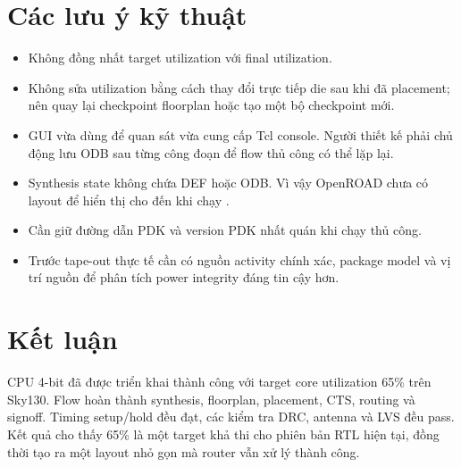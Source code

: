\documentclass[12pt,a4paper]{article}
\newcommand{\code}[1]{\texttt{\detokenize{#1}}}
\begin{document}
\section{Các lưu ý kỹ thuật}

\begin{itemize}
  \item Không đồng nhất target utilization với final utilization.
  \item Không sửa utilization bằng cách thay đổi trực tiếp die sau khi đã
  placement; nên quay lại checkpoint floorplan hoặc tạo một bộ checkpoint
  mới.
  \item GUI vừa dùng để quan sát vừa cung cấp Tcl console. Người thiết kế
  phải chủ động lưu ODB sau từng công đoạn để flow thủ công có thể lặp lại.
  \item Synthesis state không chứa DEF hoặc ODB. Vì vậy OpenROAD chưa có
  layout để hiển thị cho đến khi chạy \code{initialize_floorplan}.
  \item Cần giữ đường dẫn PDK và version PDK nhất quán khi chạy thủ công.
  \item Trước tape-out thực tế cần có nguồn activity chính xác, package
  model và vị trí nguồn để phân tích power integrity đáng tin cậy hơn.
\end{itemize}

\section{Kết luận}

CPU 4-bit đã được triển khai thành công với target core utilization 65\%
trên Sky130. Flow hoàn thành synthesis, floorplan, placement, CTS, routing
và signoff. Timing setup/hold đều đạt, các kiểm tra DRC, antenna và LVS đều
pass. Kết quả cho thấy 65\% là một target khả thi cho phiên bản RTL hiện
tại, đồng thời tạo ra một layout nhỏ gọn mà router vẫn xử lý thành công.
\end{document}
